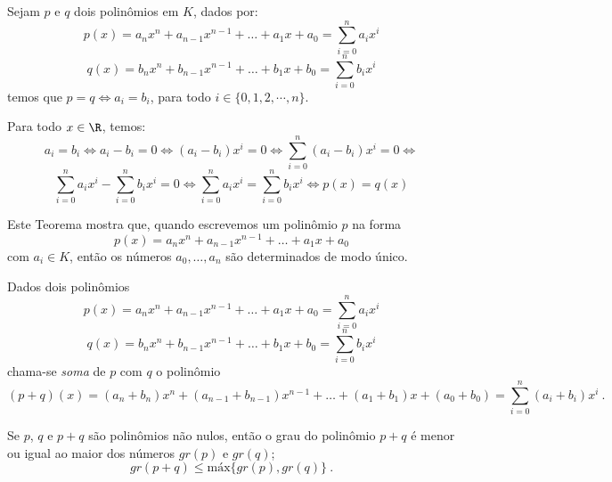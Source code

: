   \begin{teo}
  Sejam $p$ e $q$ dois polinômios em $K$, dados por:
\begin{equation}
p(x)= a_nx^n + a_{n-1}x^{n-1}+ \ldots + a_1x+ a_0= \sum_{i=0}^{n} a_ix^i
\end{equation}
\begin{equation}
q(x)= b_nx^n + b_{n-1}x^{n-1}+ \ldots + b_1x+ b_0= \sum_{i=0}^{n} b_ix^i
\end{equation}
  temos que $p=q \Leftrightarrow a_i= b_i$, para todo $i \in \{0, 1, 2, \cdots, n\}$.
 \end{teo}

 \begin{dem}
 Para todo $x \in \R$, temos:
\begin{equation}
a_i= b_i \Leftrightarrow a_i - b_i=0 \Leftrightarrow (a_i - b_i)x^i=0 \Leftrightarrow \sum_{i=0}^{n}(a_i - b_i)x^i= 0 \Leftrightarrow
\end{equation}
\begin{equation}
 \sum_{i=0}^{n}a_i x^i - \sum_{i=0}^{n}b_i x^i = 0 \Leftrightarrow \sum_{i=0}^{n}a_i x^i = \sum_{i=0}^{n}b_i x^i \Leftrightarrow p(x)= q(x)
\end{equation}

 \end{dem}

  Este Teorema mostra que, quando escrevemos um polinômio $p$ na forma
\begin{equation}
p(x)= a_nx^n + a_{n-1}x^{n-1}+ \ldots + a_1x+ a_0
\end{equation}
 com $a_i \in K$, então os números $a_0, \ldots, a_n$ são determinados de modo único.

 Dados dois polinômios
\begin{equation}
p(x)= a_nx^n + a_{n-1}x^{n-1}+ \ldots + a_1x+ a_0= \sum_{i=0}^{n} a_ix^i
\end{equation}
\begin{equation}
q(x)= b_nx^n + b_{n-1}x^{n-1}+ \ldots + b_1x+ b_0= \sum_{i=0}^{n} b_ix^i
\end{equation}
  chama-se \emph{soma} de $p$ com $q$ o polinômio
\begin{equation}
(p+q)(x)= (a_n+ b_n)x^n + (a_{n-1}+b_{n-1})x^{n-1}+ \ldots + (a_1+b_1)x+ (a_0+b_0)= \sum_{i=0}^{n} (a_i+b_i)x^i \ .
\end{equation}

  \begin{teo}
  Se $p$, $q$ e $p+q$ são polinômios não nulos, então o grau do polinômio $p+q$ é menor ou igual ao maior dos números $gr(p)$ e $gr(q)$;
\begin{equation}
gr(p+q) \leq \text{máx}\{gr(p), gr(q)\} \ .
\end{equation}
  \end{teo}

